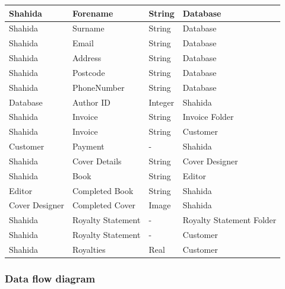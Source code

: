 \begin{center}
\begin{tabular}{|p{3cm}|p{3.5cm}|p{3cm}|p{2.5cm}|}
    Shahida & Forename & String & Database  \\ \hline
    Shahida & Surname & String & Database  \\ \hline
    Shahida & Email & String & Database  \\ \hline
    Shahida & Address & String & Database  \\ \hline
    Shahida & Postcode & String & Database  \\ \hline
    Shahida & PhoneNumber & String & Database  \\ \hline
    Database & Author ID & Integer & Shahida  \\ \hline
    Shahida & Invoice & String & Invoice Folder \\ \hline 
    Shahida & Invoice & String & Customer  \\ \hline
    Customer & Payment & - & Shahida  \\ \hline
    Shahida & Cover Details & String & Cover Designer\\ \hline
    Shahida & Book & String & Editor  \\ \hline
    Editor & Completed Book & String & Shahida  \\ \hline
    Cover Designer & Completed Cover & Image & Shahida \\ \hline
    Shahida & Royalty Statement & - & Royalty Statement Folder \\ \hline
    Shahida & Royalty Statement & - & Customer \\ \hline
    Shahida & Royalties & Real & Customer \\ \hline 
	
    \hline
\end{tabular}
\end{center}

\subsubsection{Data flow diagram}

